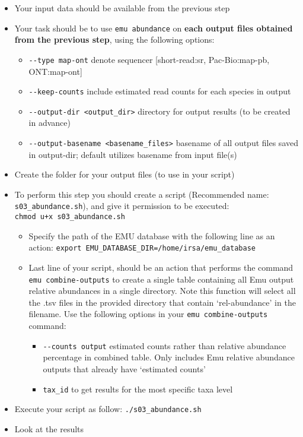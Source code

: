 \documentclass[
]{book}
\providecommand{\tightlist}{%
  \setlength{\itemsep}{0pt}\setlength{\parskip}{0pt}}
\begin{document}
\begin{itemize}
\tightlist
\item
  Your input data should be available from the previous step
\item
  Your task should be to use \texttt{emu\ abundance} on \textbf{each output files obtained from the previous step}, using the following options:

  \begin{itemize}
  \tightlist
  \item
    \texttt{-\/-type\ map-ont} denote sequencer {[}short-read:sr, Pac-Bio:map-pb, ONT:map-ont{]}
  \item
    \texttt{-\/-keep-counts} include estimated read counts for each species in output
  \item
    \texttt{-\/-output-dir\ \textless{}output\_dir\textgreater{}} directory for output results (to be created in advance)
  \item
    \texttt{-\/-output-basename\ \textless{}basename\_files\textgreater{}} basename of all output files saved in output-dir; default utilizes basename from input file(s)
  \end{itemize}
\item
  Create the folder for your output files (to use in your script)
\item
  To perform this step you should create a script (Recommended name: \texttt{s03\_abundance.sh}), and give it permission to be executed: \texttt{chmod\ u+x\ s03\_abundance.sh}

  \begin{itemize}
  \tightlist
  \item
    Specify the path of the EMU database with the following line as an action: \texttt{export\ EMU\_DATABASE\_DIR=/home/irsa/emu\_database}
  \item
    Last line of your script, should be an action that performs the command \texttt{emu\ combine-outputs} to create a single table containing all Emu output relative abundances in a single directory. Note this function will select all the .tsv files in the provided directory that contain `rel-abundance' in the filename. Use the following options in your \texttt{emu\ combine-outputs} command:

    \begin{itemize}
    \tightlist
    \item
      \texttt{-\/-counts\ output} estimated counts rather than relative abundance percentage in combined table. Only includes Emu relative abundance outputs that already have `estimated counts'
    \item
      \texttt{tax\_id} to get results for the most specific taxa level
    \end{itemize}
  \end{itemize}
\item
  Execute your script as follow: \texttt{./s03\_abundance.sh}
\item
  Look at the results
\end{itemize}
\end{document}

